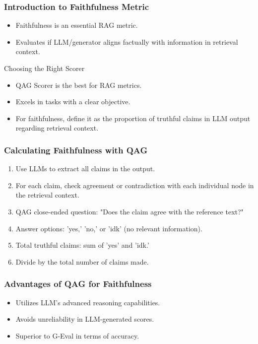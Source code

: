 \begin{frame}[fragile]\frametitle{Introduction to Faithfulness Metric}
  \begin{itemize}
    \item Faithfulness is an essential RAG metric.
    \item Evaluates if LLM/generator aligns factually with information in retrieval context.
  \end{itemize}
  
Choosing the Right Scorer
  \begin{itemize}
    \item QAG Scorer is the best for RAG metrics.
    \item Excels in tasks with a clear objective.
    \item For faithfulness, define it as the proportion of truthful claims in LLM output regarding retrieval context.
  \end{itemize}
\end{frame}

\begin{frame}[fragile]\frametitle{Calculating Faithfulness with QAG}
  \begin{enumerate}
    \item Use LLMs to extract all claims in the output.
    \item For each claim, check agreement or contradiction with each individual node in the retrieval context.
    \item QAG close-ended question: "Does the claim agree with the reference text?"
    \item Answer options: 'yes,' 'no,' or 'idk' (no relevant information).
    \item Total truthful claims: sum of 'yes' and 'idk.'
    \item Divide by the total number of claims made.
  \end{enumerate}
\end{frame}

\begin{frame}[fragile]\frametitle{Advantages of QAG for Faithfulness}
  \begin{itemize}
    \item Utilizes LLM's advanced reasoning capabilities.
    \item Avoids unreliability in LLM-generated scores.
    \item Superior to G-Eval in terms of accuracy.
  \end{itemize}
\end{frame}

